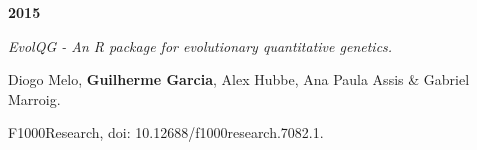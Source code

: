\documentclass[12pt,twoside]{report}
\begin{document}
\vspace {0.3 cm}

\textbf{2015}

\textit {EvolQG - An R package for evolutionary quantitative genetics.}

Diogo Melo, \textbf{Guilherme Garcia}, Alex Hubbe, Ana Paula Assis \& Gabriel Marroig.  

F1000Research, doi: 10.12688/f1000research.7082.1.






\end{document}

